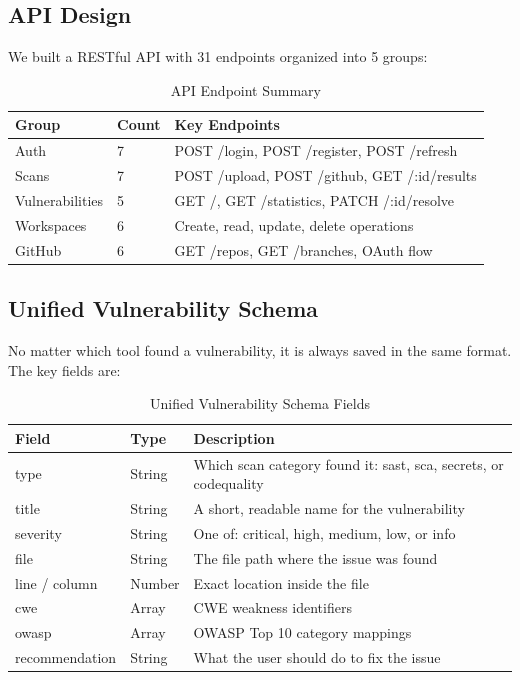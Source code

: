 \documentclass[12pt,a4paper]{report}
\begin{document}
\clearpage
\subsection{API Design}

We built a RESTful API with 31 endpoints organized into 5 groups:

\begin{table}[H]
\centering
\caption{API Endpoint Summary}
\label{tab:api_endpoints}
\begin{tabular}{|l|l|p{6cm}|}
\hline
\textbf{Group} & \textbf{Count} & \textbf{Key Endpoints} \\
\hline
Auth & 7 & POST /login, POST /register, POST /refresh \\
\hline
Scans & 7 & POST /upload, POST /github, GET /:id/results \\
\hline
Vulnerabilities & 5 & GET /, GET /statistics, PATCH /:id/resolve \\
\hline
Workspaces & 6 & Create, read, update, delete operations \\
\hline
GitHub & 6 & GET /repos, GET /branches, OAuth flow \\
\hline
\end{tabular}
\end{table}

\subsection{Unified Vulnerability Schema}

No matter which tool found a vulnerability, it is always saved in the same format. The key fields are:

\begin{table}[H]
\centering
\caption{Unified Vulnerability Schema Fields}
\label{tab:vuln_schema}
\begin{tabular}{|l|l|p{6cm}|}
\hline
\textbf{Field} & \textbf{Type} & \textbf{Description} \\
\hline
type & String & Which scan category found it: sast, sca, secrets, or codequality \\
\hline
title & String & A short, readable name for the vulnerability \\
\hline
severity & String & One of: critical, high, medium, low, or info \\
\hline
file & String & The file path where the issue was found \\
\hline
line / column & Number & Exact location inside the file \\
\hline
cwe & Array & CWE weakness identifiers \\
\hline
owasp & Array & OWASP Top 10 category mappings \\
\hline
recommendation & String & What the user should do to fix the issue \\
\hline
\end{tabular}
\end{table}
\end{document}
